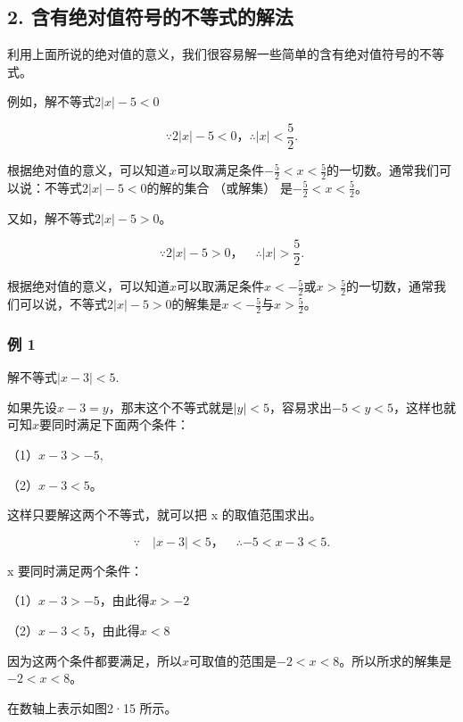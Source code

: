 \subsection{2. 含有绝对值符号的不等式的解法}

利用上面所说的绝对值的意义，我们很容易解一些简单的含有绝对值符号的不等式。

例如，解不等式\(2|x| - 5 < 0\)

\[
\because 2 | x | - 5 <   0\text{，} \therefore | x | <   \frac{5}{2}.
\]

根据绝对值的意义，可以知道\(x\)可以取满足条件\(-\frac{5}{2} < x < \frac{5}{2}\)的一切数。通常我们可以说：不等式\(2|x| - 5 < 0\)的解的集合
（或解集） 是\(-\frac{5}{2} < x < \frac{5}{2}\)。

又如，解不等式\(2|x| - 5 > 0\)。

\[
\because 2 | x | - 5 > 0\text{，} \quad \therefore | x | > \frac{5}{2}.
\]

根据绝对值的意义，可以知道\(x\)可以取满足条件\(x < -\frac{5}{2}\)或\(x > \frac{5}{2}\)的一切数，通常我们可以说，不等式\(2|x| - 5 > 0\)的解集是\(x < -\frac{5}{2}\)与\(x > \frac{5}{2}\)。

\subsubsection{例 1}

解不等式\(\left|x-3\right|<5.\)

如果先设\(x - 3 = y\)，那末这个不等式就是\(|y| < 5\)，容易求出\(-5 < y < 5\)，这样也就可知\(x\)要同时满足下面两个条件：

（1）\(x - 3 > -5,\)

（2）\(x - 3 < 5\)。

这样只要解这两个不等式，就可以把 x 的取值范围求出。


\[
\because \quad | x - 3 | <   5\text{，} \quad \therefore - 5 <   x - 3 <   5.
\]

x 要同时满足两个条件：

（1）\(x - 3 > -5\)，由此得\(x > -2\)

（2）\(x - 3 < 5\)，由此得\(x < 8\)

因为这两个条件都要满足，所以\(x\)可取值的范围是\(-2 < x < 8\)。所以所求的解集是\(-2 < x < 8\)。

在数轴上表示如图2·15 所示。

